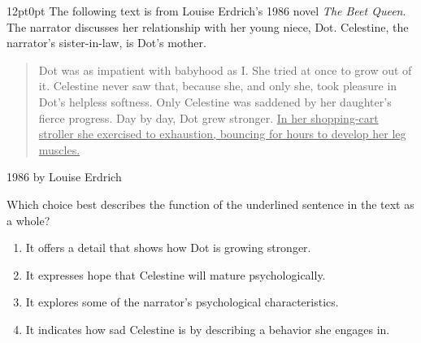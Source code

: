 \documentclass[11pt, twocolumn]{article}
\newcounter{questionnum}
\begin{document}
\vspace{6pt}\noindent
\begin{minipage}{\columnwidth}\raggedright
\noindent{}\par\vspace{8pt}
\begin{adjustwidth}{12pt}{0pt}
The following text is from Louise Erdrich's 1986 novel \textit{The Beet Queen}. The narrator discusses her relationship with her young niece, Dot. Celestine, the narrator's sister-in-law, is Dot's mother.

\vspace{6pt}
\begin{quote}

Dot was as impatient with babyhood as I. She tried at once to grow out of it. Celestine never saw that, because she, and only she, took pleasure in Dot's helpless softness. Only Celestine was saddened by her daughter's fierce progress. Day by day, Dot grew stronger. \uline{In her shopping-cart stroller she exercised to exhaustion, bouncing for hours to develop her leg muscles.}

\end{quote}

\textcopyright{}1986 by Louise Erdrich
\vspace{6pt}

Which choice best describes the function of the underlined sentence in the text as a whole?
\begin{enumerate}[label=\Alph*),leftmargin=18pt,topsep=3pt,itemsep=2pt]
  \item It offers a detail that shows how Dot is growing stronger.
  \item It expresses hope that Celestine will mature psychologically.
  \item It explores some of the narrator's psychological characteristics.
  \item It indicates how sad Celestine is by describing a behavior she engages in.
\end{enumerate}
\end{adjustwidth}
\end{minipage}\par
\end{document}
